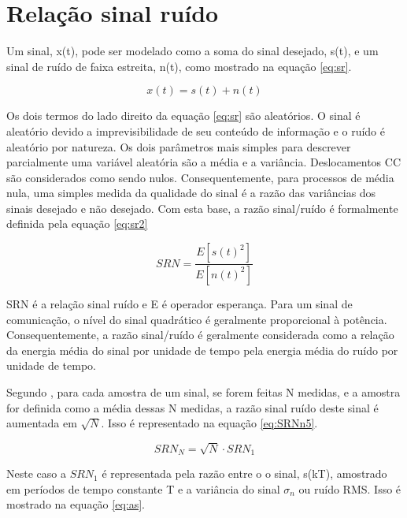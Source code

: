 \section{Relação sinal ruído}

Um sinal, x(t), pode ser modelado como a soma do sinal desejado, s(t), e um sinal de ruído de faixa estreita, n(t), como mostrado na equação \ref{eq:sr}. \cite{haykinintrodução}

\begin{equation}
    \label{eq:sr}
    x(t) = s(t) + n(t)
\end{equation}

Os dois termos do lado direito da equação \ref{eq:sr} são aleatórios. O sinal é aleatório devido a imprevisibilidade de seu conteúdo de informação e o ruído é aleatório por natureza. Os dois parâmetros mais simples para descrever parcialmente uma variável aleatória são a média e a variância. Deslocamentos CC são considerados como sendo nulos. Consequentemente, para processos de média nula, uma simples medida da qualidade do sinal é a razão das variâncias dos sinais desejado e não desejado. Com esta base, a razão sinal/ruído é formalmente definida pela equação \ref{eq:sr2} \cite{haykinintrodução}

\begin{equation}
    \label{eq:sr2}
    SRN = \frac{E[s(t)^2]}{E[n(t)^2]}
\end{equation}

SRN é a relação sinal ruído e E é operador esperança. Para um sinal de comunicação, o nível do sinal quadrático é geralmente proporcional à potência. Consequentemente, a razão sinal/ruído é geralmente considerada como a relação da energia média do sinal por unidade de tempo pela energia média do ruído por unidade de tempo. \cite{haykinintrodução}
 
Segundo \cite{noiseRedArt}, para cada amostra de um sinal, se forem feitas N medidas, e a amostra for definida como a média dessas N medidas, a razão sinal ruído deste sinal é aumentada em $\sqrt{N}$. Isso é representado na equação \ref{eq:SRNn5}.

\begin{equation}
    \label{eq:SRNn5}
    SRN_N = \sqrt{N}\cdot SRN_1
\end{equation}

Neste caso a $SRN_1$ é representada pela razão entre o o sinal, s(kT), amostrado em períodos de tempo constante T e a variância do sinal $\sigma _n$ ou ruído RMS. Isso é mostrado na equação \ref{eq:as}. \cite{noiseRedArt}

